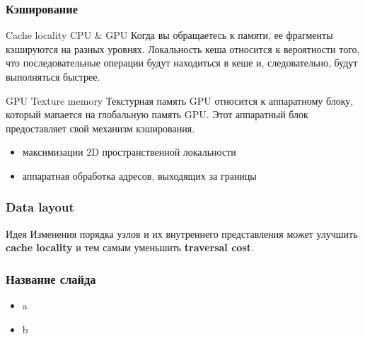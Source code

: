 \documentclass{beamer}
\begin{document}
\begin{frame}
    \frametitle{Кэширование}
    \begin{block}{Cache locality CPU \& GPU}
        Когда вы обращаетесь к памяти, ее фрагменты кэшируются на разных уровнях.
        Локальность кеша относится к вероятности того,
        что последовательные операции будут находиться в кеше и,
        следовательно, будут выполняться быстрее.
    \end{block}
    \begin{block}{GPU Texture memory}
        Текстурная память GPU относится к аппаратному блоку, который мапается на глобальную память GPU.
        Этот аппаратный блок предоставляет свой механизм кэширования.
        \begin{itemize}
            \item
                максимизации 2D пространственной локальности
            \item
                аппаратная обработка адресов, выходящих за границы
        \end{itemize}
    \end{block}
\end{frame}

\begin{frame}
    \frametitle{Data layout}
    \begin{block}{Идея}
        Изменения порядка узлов и их внутреннего представления может улучшить \textbf{cache locality}
        и тем самым уменьшить \textbf{traversal cost}.
    \end{block}
\end{frame}

\begin{frame}
    \frametitle{Название слайда}
    \begin{itemize}
        \item
            a
        \item
            b
    \end{itemize}
\end{frame}
\end{document}
